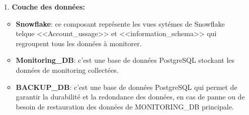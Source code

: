     \begin{enumerate}

        \item[1.] \textbf{Couche des données:} 
                \begin{itemize}
                \item \textbf{Snowflake}: ce composant représente les vues sytémes de Snowflake telque <<Account\_ussage>> et <<information\_schema>> qui regroupent tous les données à monitorer.
                \item \textbf{Monitoring\_DB}: c'est une base de données PostgreSQL stockant les données de monitoring collectées.
                \item \textbf{BACKUP\_DB}: c'est une base de données PostgreSQL qui permet de garantir la durabilité et la redondance des données, en cas de panne ou de besoin de restauration des données de MONITORING\_DB principale.

            \end{itemize}
            

\end{enumerate}
